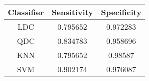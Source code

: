 \begin{tabular}{|c|c|c|}
 \hline 
Classifier & Sensitivity & Specificity \\ 
 \hline 
LDC & 0.795652 & 0.972283 \\ 
 \hline 
QDC & 0.834783 & 0.958696 \\ 
 \hline 
KNN & 0.795652 & 0.98587 \\ 
 \hline 
SVM & 0.902174 & 0.976087 \\ 
 \hline 
\end{tabular}